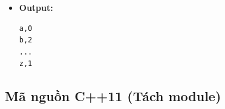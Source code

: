 \begin{itemize}
\begin{itemize}
        \item \textbf{Module 3 (Đếm tần suất):}

        \begin{itemize}
            \item Dùng:
\begin{lstlisting}
vector<int> freq(26, 0)
\end{lstlisting}

            \item Với mỗi ký tự hợp lệ:
\begin{lstlisting}
freq[c - 'a']++
\end{lstlisting}
        \end{itemize}

        \item \textbf{Module 4 (Ghi output):}

        \begin{itemize}
            \item File:
\begin{lstlisting}
char_freq.csv
\end{lstlisting}

            \item Format:
\begin{lstlisting}
char,count
\end{lstlisting}

            \item Luôn ghi đủ 26 dòng
        \end{itemize}

    \end{itemize}

    \item \textbf{Output:}

\begin{lstlisting}
a,0
b,2
...
z,1
\end{lstlisting}

\end{itemize}

\subsection{Mã nguồn C++11 (Tách module)}

